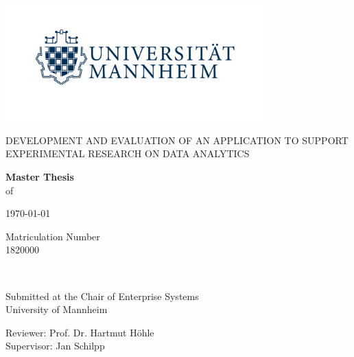 \begin{titlepage}
	\centering

    \includegraphics[width=10cm]{template/logo_university_of_mannheim_no_bwl.png}\par

	\vspace{1.25cm}
	{\scshape\Large\uppercase{Development and Evaluation of an Application to Support Experimental Research on Data Analytics}\par}
	
	\vspace{2.75cm}
	{\linespread{1}\normalsize \textbf{Master Thesis}\\
	 of  \par}
	
	{\large {}\par}
	
	\vspace{0.5cm}
	{\small \today \par}
	
	\vspace{0.3cm}
	{\footnotesize  Matriculation Number\\
	1820000\par}
	
	\vspace{2cm}
	\hrulefill\\	
	\vspace{1.0cm}
	{\linespread{1}\normalsize Submitted at the Chair of Enterprise Systems\\
	University of Mannheim\par}
	
	\vspace{0.3cm}
	{\linespread{1}\normalsize  Reviewer: Prof. Dr. Hartmut Höhle\\
	Supervisor: Jan Schilpp\par}


\end{titlepage}
